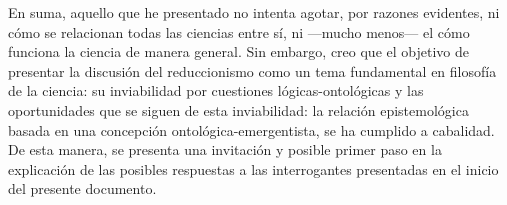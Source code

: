 \documentclass[]{book}
\begin{document}
\begin{refsection}
En suma, aquello que he presentado no intenta agotar, por razones
evidentes, ni cómo se relacionan todas las ciencias entre sí, ni
---mucho menos--- el cómo funciona la ciencia de manera general. Sin
embargo, creo que el objetivo de presentar la discusión del
reduccionismo como un tema fundamental en filosofía de la ciencia: su
inviabilidad por cuestiones lógicas-ontológicas y las oportunidades que
se siguen de esta inviabilidad: la relación epistemológica basada en una
concepción ontológica-emergentista, se ha cumplido a cabalidad. De esta
manera, se presenta una invitación y posible primer paso en la
explicación de las posibles respuestas a las interrogantes presentadas
en el inicio del presente documento.

\nocite{Beckermann1992}
\nocite{Broad1925}
\nocite{Churchland1985}
\nocite{Hendry2012}
\nocite{Lombardi2013}
\nocite{LombardiLabarca2005}
\nocite{McIntyre2007}
\nocite{Morales2014}
\nocite{Nagel1961}
\nocite{Nagel1970}
\nocite{Needham2006}
\nocite{Scerri1994}
\nocite{Scerri2007}
\nocite{vanRiel2011}


\printbibliography[heading=subbibliography,title={Referencias}]

\end{refsection}
\end{document}
